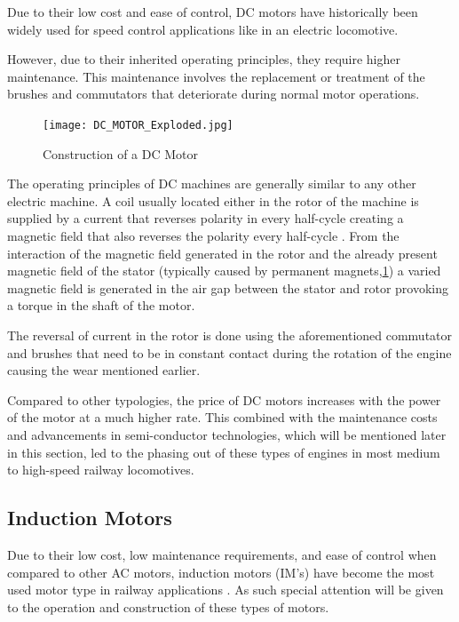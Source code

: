 Due to their low cost and ease of control, DC motors have historically been widely used for speed control applications like in an electric locomotive. 

However, due to their inherited operating principles, they require higher maintenance. This maintenance involves the replacement or treatment of the brushes and commutators that deteriorate during normal motor operations. 

\begin{figure}[ht]
    \centering
    \texttt{[image: DC\_MOTOR\_Exploded.jpg]}
    \caption{Construction of a DC Motor \cite{Mohan}}
    \label{fig:DC_Motor}
\end{figure}

The operating principles of DC machines are generally similar to any other electric machine. A coil usually located either in the rotor of the machine is supplied by a current that reverses polarity in every half-cycle creating a magnetic field that also reverses the polarity every half-cycle \cite{Mohan}. From the interaction of the magnetic field generated in the rotor and the already present magnetic field of the stator (typically caused by permanent magnets,\ref{fig:DC_Motor}) a varied magnetic field is generated in the air gap between the stator and rotor provoking a torque in the shaft of the motor. 

The reversal of current in the rotor is done using the aforementioned commutator and brushes that need to be in constant contact during the rotation of the engine causing the wear mentioned earlier.

Compared to other typologies, the price of DC motors increases with the power of the motor at a much higher rate. This combined with the maintenance costs and advancements in semi-conductor technologies, which will be mentioned later in this section, led to the phasing out of these types of engines in most medium to high-speed railway locomotives.

\subsection{Induction Motors}
Due to their low cost, low maintenance requirements, and ease of control when compared to other AC motors, induction motors (IM's) have become the most used motor type in railway applications \cite{MainSOTA}. As such special attention will be given to the operation and construction of these types of motors. 


